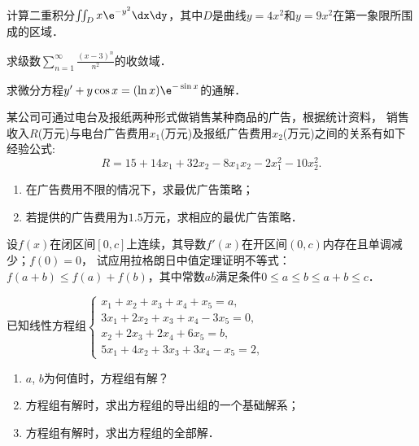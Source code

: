\documentclass[plain,noanswer,medmath]{../../template/jnuexam}
\begin{document}
\begin{problem}
计算二重积分$\iint_D x\e^{-y^2}\dx\dy$，其中$D$是曲线$y=4x^2$和$y=9x^2$在第一象限所围成的区域．
\end{problem}


\begin{problem}
求级数$\sum_{n=1}^{\infty}\frac{(x-3)^n}{n^2}$的收敛域．
\end{problem}


\begin{problem}
求微分方程$y'+y\cos x=(\ln x)\e^{-\sin x}$的通解．
\end{problem}




\begin{problem}
某公司可通过电台及报纸两种形式做销售某种商品的广告，根据统计资料，
销售收入$R$(万元)与电台广告费用$x_1$(万元)及报纸广告费用$x_2$(万元)之间的关系有如下经验公式:
$$R=15+14x_1+32x_2-8x_1x_2-2x_1^2-10x_2^2.$$
\begin{enumerate}
\item 在广告费用不限的情况下，求最优广告策略；
\item 若提供的广告费用为$1.5$万元，求相应的最优广告策略．
\end{enumerate}
\end{problem}




\begin{problem}
设$f(x)$在闭区间$[0,c]$上连续，其导数$f'(x)$在开区间$(0,c)$内存在且单调减少；$f(0)=0$，
试应用拉格朗日中值定理证明不等式：$f(a+b)\le f(a)+f(b)$，其中常数$ab$满足条件$0\le a\le b\le a+b\le c$．
\end{problem}




\begin{problem}
已知线性方程组$\begin{cases}
  x_1+x_2+x_3+x_4+x_5=a, \\
  3x_1+2x_2+x_3+x_4-3x_5=0, \\
  x_2+2x_3+2x_4+6x_5=b, \\
  5x_1+4x_2+3x_3+3x_4-x_5=2,
\end{cases}$
\begin{enumerate}
\item $a$, $b$为何值时，方程组有解？
\item 方程组有解时，求出方程组的导出组的一个基础解系；
\item 方程组有解时，求出方程组的全部解．
\end{enumerate}
\end{problem}
\end{document}
